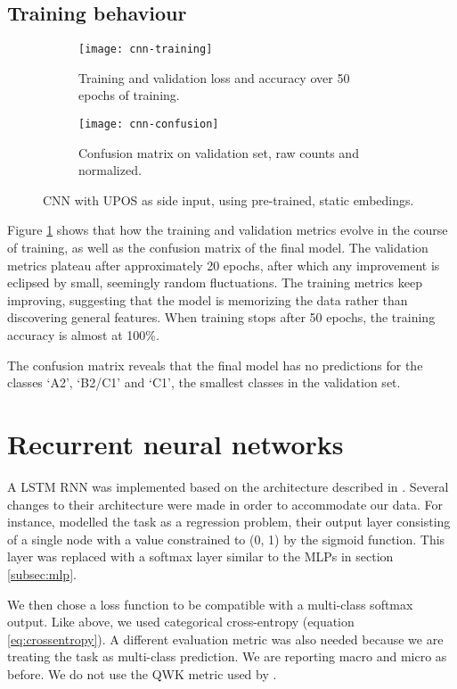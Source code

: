 \subsection{Training behaviour}

\begin{figure}
  \begin{subfigure}{\linewidth}
    \centering
    \texttt{[image: cnn-training]}
    \caption{Training and validation loss and accuracy over 50 epochs of training.}
  \end{subfigure}
  \begin{subfigure}{\linewidth}
    \centering
    \texttt{[image: cnn-confusion]}
    \caption{Confusion matrix on validation set, raw counts and normalized.}
  \end{subfigure}
  \caption{CNN with UPOS as side input, using pre-trained, static embedings.}
  \label{fig:cnn-training}
\end{figure}

Figure \ref{fig:cnn-training} shows that how the training and validation
metrics evolve in the course of training, as well as the confusion matrix of
the final model. The validation metrics plateau after approximately 20
epochs, after which any improvement is eclipsed by small, seemingly random
fluctuations. The training metrics keep improving, suggesting that the model
is memorizing the data rather than discovering general features. When
training stops after 50 epochs, the training accuracy is almost at 100\%.

The confusion matrix reveals that the final model has no predictions for the
classes `A2', `B2/C1' and `C1', the smallest classes in the validation set.


\section{Recurrent neural networks}

A \ac{LSTM} \ac{RNN} was implemented based on the architecture described in
\textcite{taghipour16}. Several changes to their architecture were made in
order to accommodate our data. For instance, \citeauthor{taghipour16} modelled
the task as a regression problem, their output layer consisting of a single
node with a value constrained to (0, 1) by the sigmoid function. This layer
was replaced with a softmax layer similar to the \acp{MLP} in section
\ref{subsec:mlp}.

We then chose a loss function to be compatible with a multi-class softmax
output. Like above, we used categorical cross-entropy (equation
\ref{eq:crossentropy}). A different evaluation metric was also needed because
we are treating the task as multi-class prediction. We are reporting macro
and micro \FI as before. We do not use the \ac{QWK} metric used by
\citeauthor{taghipour16}.

